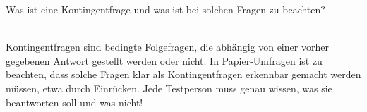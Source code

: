 \begin{exercise}
  Was ist eine Kontingentfrage und was ist bei solchen Fragen zu beachten?
  \\\\  
\end{exercise}
Kontingentfragen sind bedingte Folgefragen, die abhängig von einer vorher gegebenen Antwort gestellt werden oder nicht.
In Papier-Umfragen ist zu beachten, 
dass solche Fragen klar als Kontingentfragen erkennbar gemacht werden müssen, etwa durch Einrücken.
Jede Testperson muss genau wissen, was sie beantworten soll und was nicht!